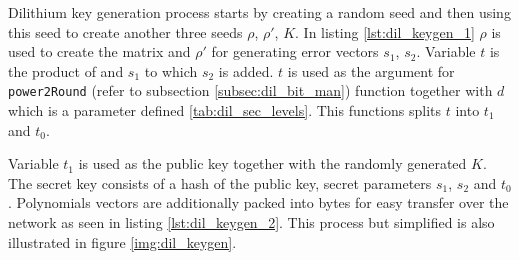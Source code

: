 Dilithium key generation process starts by creating a random seed and then using this seed to create another three seeds $\rho$, $\rho'$, $K$. In listing \ref{lst:dil_keygen_1} $\rho$ is used to create the matrix  and $\rho'$ for generating error vectors $s_1$, $s_2$. Variable $t$ is the product of  and $s_1$ to which $s_2$ is added. $t$ is used as the argument for \texttt{power2Round} (refer to subsection \ref{subsec:dil_bit_man}) function together with $d$ which is a parameter defined \ref{tab:dil_sec_levels}. This functions splits $t$ into $t_1$ and $t_0$.
\newpage
{}

Variable $t_1$ is used as the public key together with the randomly generated $K$. The secret key consists of a hash of the public key, secret parameters $s_1$, $s_2$ and $t_0$. Polynomials vectors are additionally packed into bytes for easy transfer over the network as seen in listing \ref{lst:dil_keygen_2}. This process but simplified is also illustrated in figure \ref{img:dil_keygen}.

